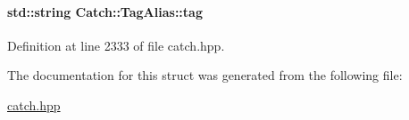 \paragraph[{tag}]{\setlength{\rightskip}{0pt plus 5cm}std\+::string Catch\+::\+Tag\+Alias\+::tag}\label{a00084_a950183883ab17c90d0fab16b966b6e2d}


Definition at line 2333 of file catch.\+hpp.



The documentation for this struct was generated from the following file\+:\begin{DoxyCompactItemize}
\item 
\hyperlink{a00094}{catch.\+hpp}\end{DoxyCompactItemize}
